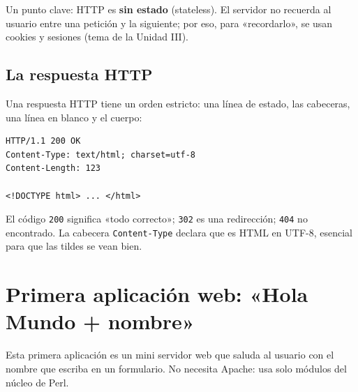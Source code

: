 \documentclass[11pt]{article}
\begin{document}
Un punto clave: HTTP es \textbf{sin estado} (stateless). El servidor no recuerda al usuario entre una petición y la siguiente; por eso, para «recordarlo», se usan cookies y sesiones (tema de la Unidad III).

\subsection{La respuesta HTTP}
Una respuesta HTTP tiene un orden estricto: una línea de estado, las cabeceras, una línea en blanco y el cuerpo:

\begin{cajacodigo}
\begin{lstlisting}[style=markup]
HTTP/1.1 200 OK
Content-Type: text/html; charset=utf-8
Content-Length: 123

<!DOCTYPE html> ... </html>
\end{lstlisting}
\end{cajacodigo}
\vspace{2pt}
El código \texttt{200} significa «todo correcto»; \texttt{302} es una redirección; \texttt{404} no encontrado. La cabecera \texttt{Content-Type} declara que es HTML en UTF-8, esencial para que las tildes se vean bien.

\section{Primera aplicación web: «Hola Mundo + nombre»}
Esta primera aplicación es un mini servidor web que saluda al usuario con el nombre que escriba en un formulario. No necesita Apache: usa solo módulos del núcleo de Perl.
\end{document}
